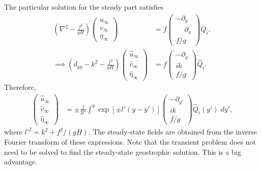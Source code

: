 \documentclass[10pt,reqno]{amsart}
\begin{document}
The particular solution for the steady part satisfies
\begin{align}
\left( \nabla^2 - \frac{f^2}{gH} \right)\begin{pmatrix}
u_{\infty} \\
v_{\infty} \\
\eta_{\infty}
\end{pmatrix} & = 
f \begin{pmatrix}
- \partial_y \\
\phantom{-} \partial_x \\
f/g 
\end{pmatrix} Q_i ,  \\
\implies
\left( d_{yy} - k^2 - \frac{f^2}{gH} \right)\begin{pmatrix}
\hat{u}_{\infty} \\
\hat{v}_{\infty} \\
\hat{\eta}_{\infty}
\end{pmatrix} & = 
f \begin{pmatrix}
- \partial_y \\
i k  \\
f/g 
\end{pmatrix} \hat{Q}_i .  
\label{eqn:inf_plane_steady}
\end{align}
Therefore,
\begin{align}
\begin{pmatrix}
\hat{u}_{\infty} \\
\hat{v}_{\infty} \\
\hat{\eta}_{\infty}
\end{pmatrix} & = 
\pm \frac{f}{2 l'}  \int^y \exp \left[ \pm l'\left( y - y' \right) \right]
 \begin{pmatrix}
- \partial_{y'} \\
i  k \\
f/g 
\end{pmatrix} \hat{Q}_i (y')
  \; d y' ,  
\end{align}
where $l'^2 = k^2 + f^2/(gH)$.
The steady-state fields are obtained from the inverse Fourier transform of these expressions.
Note that the transient problem does not need to be solved to find the steady-state geostrophic solution.
This is a big advantage.
\end{document}

